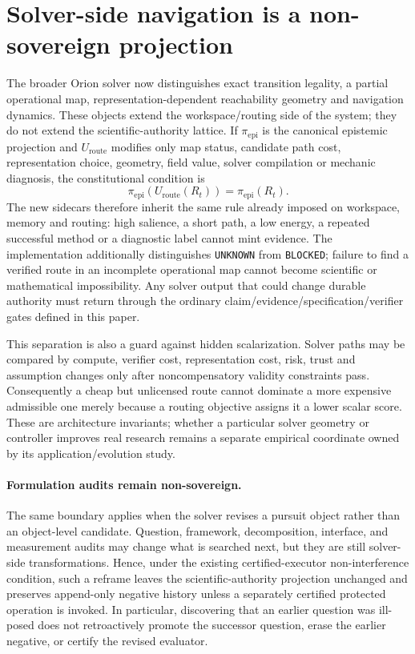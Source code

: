 \section{Solver-side navigation is a non-sovereign projection}
\label{sec:solver_noninterference}

The broader Orion solver now distinguishes exact transition legality, a partial operational map, representation-dependent reachability geometry and navigation dynamics. These objects extend the workspace/routing side of the system; they do not extend the scientific-authority lattice. If $\pi_{\mathrm{epi}}$ is the canonical epistemic projection and $U_{\mathrm{route}}$ modifies only map status, candidate path cost, representation choice, geometry, field value, solver compilation or mechanic diagnosis, the constitutional condition is
\[
\pi_{\mathrm{epi}}(U_{\mathrm{route}}(R_t))=\pi_{\mathrm{epi}}(R_t).
\]
The new sidecars therefore inherit the same rule already imposed on workspace, memory and routing: high salience, a short path, a low energy, a repeated successful method or a diagnostic label cannot mint evidence. The implementation additionally distinguishes \texttt{UNKNOWN} from \texttt{BLOCKED}; failure to find a verified route in an incomplete operational map cannot become scientific or mathematical impossibility. Any solver output that could change durable authority must return through the ordinary claim/evidence/specification/verifier gates defined in this paper.

This separation is also a guard against hidden scalarization. Solver paths may be compared by compute, verifier cost, representation cost, risk, trust and assumption changes only after noncompensatory validity constraints pass. Consequently a cheap but unlicensed route cannot dominate a more expensive admissible one merely because a routing objective assigns it a lower scalar score. These are architecture invariants; whether a particular solver geometry or controller improves real research remains a separate empirical coordinate owned by its application/evolution study.

\paragraph{Formulation audits remain non-sovereign.}
The same boundary applies when the solver revises a pursuit object rather than an
object-level candidate.  Question, framework, decomposition, interface, and
measurement audits may change what is searched next, but they are still solver-side
transformations.  Hence, under the existing certified-executor non-interference
condition, such a reframe leaves the scientific-authority projection unchanged and
preserves append-only negative history unless a separately certified protected
operation is invoked.  In particular, discovering that an earlier question was
ill-posed does not retroactively promote the successor question, erase the earlier
negative, or certify the revised evaluator.
